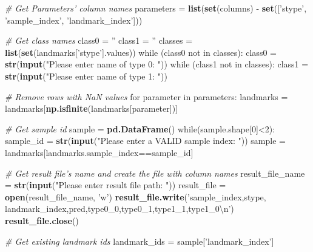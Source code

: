 \documentclass[10pt,letterpaper]{article}
\newenvironment{Shaded}{\begin{snugshade}}{\end{snugshade}}
\newcommand{\KeywordTok}[1]{\textcolor[rgb]{0.13,0.29,0.53}{\textbf{#1}}}
\newcommand{\DecValTok}[1]{\textcolor[rgb]{0.00,0.00,0.81}{#1}}
\newcommand{\CharTok}[1]{\textcolor[rgb]{0.31,0.60,0.02}{#1}}
\newcommand{\StringTok}[1]{\textcolor[rgb]{0.31,0.60,0.02}{#1}}
\newcommand{\CommentTok}[1]{\textcolor[rgb]{0.56,0.35,0.01}{\textit{#1}}}
\newcommand{\NormalTok}[1]{#1}
\begin{document}
\begin{Shaded}
\begin{Highlighting}[]
    \CommentTok{# Get Parameters' column names}
    \NormalTok{parameters =}\StringTok{ }\KeywordTok{list}\NormalTok{(}\KeywordTok{set}\NormalTok{(columns) -}
\StringTok{        }\KeywordTok{set}\NormalTok{([}\StringTok{'stype'}\NormalTok{, }\StringTok{'sample_index'}\NormalTok{, }\StringTok{'landmark_index'}\NormalTok{]))}

    \CommentTok{# Get class names}
    \NormalTok{class0 =}\StringTok{ ''}
    \NormalTok{class1 =}\StringTok{ ''}
    \NormalTok{classes =}\StringTok{ }\KeywordTok{list}\NormalTok{(}\KeywordTok{set}\NormalTok{(landmarks[}\StringTok{'stype'}\NormalTok{].values))}
    \NormalTok{while (class0 not in classes):}
\StringTok{        }\NormalTok{class0 =}\StringTok{ }\KeywordTok{str}\NormalTok{(}\KeywordTok{input}\NormalTok{(}\StringTok{"Please enter name of type 0: "}\NormalTok{))}
    \NormalTok{while (class1 not in classes):}
\StringTok{        }\NormalTok{class1 =}\StringTok{ }\KeywordTok{str}\NormalTok{(}\KeywordTok{input}\NormalTok{(}\StringTok{"Please enter name of type 1: "}\NormalTok{))}

    \CommentTok{# Remove rows with NaN values}
    \NormalTok{for parameter in parameters:}
\StringTok{        }\NormalTok{landmarks =}\StringTok{ }\NormalTok{landmarks[}\KeywordTok{np.isfinite}\NormalTok{(landmarks[parameter])]}

    \CommentTok{# Get sample id}
    \NormalTok{sample =}\StringTok{ }\KeywordTok{pd.DataFrame}\NormalTok{()}
    \NormalTok{while(sample.shape[}\DecValTok{0}\NormalTok{]<}\DecValTok{2}\NormalTok{):}
\StringTok{        }\NormalTok{sample_id =}\StringTok{ }\KeywordTok{str}\NormalTok{(}\KeywordTok{input}\NormalTok{(}\StringTok{"Please enter a VALID sample index: "}\NormalTok{))}
        \NormalTok{sample =}\StringTok{ }\NormalTok{landmarks[landmarks.sample_index==sample_id]}

    \CommentTok{# Get result file's name and create the file with column names}
    \NormalTok{result_file_name =}\StringTok{ }\KeywordTok{str}\NormalTok{(}\KeywordTok{input}\NormalTok{(}\StringTok{"Please enter result file path: "}\NormalTok{))}
    \NormalTok{result_file =}\StringTok{ }\KeywordTok{open}\NormalTok{(result_file_name, }\StringTok{'w'}\NormalTok{)}
    \KeywordTok{result_file.write}\NormalTok{(}\StringTok{'sample_index,stype,}
\StringTok{        landmark_index,pred,type0_0,type0_1,type1_1,type1_0}\CharTok{\textbackslash{}n}\StringTok{'}\NormalTok{)}
    \KeywordTok{result_file.close}\NormalTok{()}

    \CommentTok{# Get existing landmark ids}
    \NormalTok{landmark_ids =}\StringTok{ }\NormalTok{sample[}\StringTok{'landmark_index'}\NormalTok{]}


\end{Highlighting}
\end{Shaded}
\end{document}
